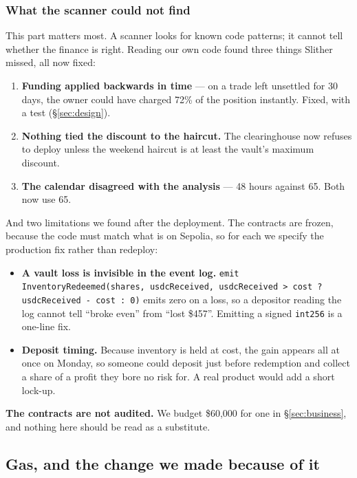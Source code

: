 \documentclass[11pt,a4paper]{article}
\begin{document}
\subsubsection*{What the scanner could not find}\label{sec:selffound}

This part matters most. A scanner looks for known code patterns; it cannot tell whether the finance
is right. Reading our own code found three things Slither missed, all now fixed:

\begin{enumerate}
  \item \textbf{Funding applied backwards in time} — on a trade left unsettled for 30 days, the owner
  could have charged 72\% of the position instantly. Fixed, with a test (\S\ref{sec:design}).
  \item \textbf{Nothing tied the discount to the haircut.} The clearinghouse now refuses to deploy
  unless the weekend haircut is at least the vault's maximum discount.
  \item \textbf{The calendar disagreed with the analysis} — 48 hours against 65. Both now use 65.
\end{enumerate}

And two limitations we found after the deployment. The contracts are frozen, because the code must
match what is on Sepolia, so for each we specify the production fix rather than redeploy:

\begin{itemize}
  \item \textbf{A vault loss is invisible in the event log.}
  \texttt{emit InventoryRedeemed(shares, usdcReceived, usdcReceived > cost ? usdcReceived - cost : 0)}
  emits zero on a loss, so a depositor reading the log cannot tell ``broke even'' from ``lost
  \$457''. Emitting a signed \texttt{int256} is a one-line fix.
  \item \textbf{Deposit timing.} Because inventory is held at cost, the gain appears all at once on
  Monday, so someone could deposit just before redemption and collect a share of a profit they bore
  no risk for. A real product would add a short lock-up.
\end{itemize}

\textbf{The contracts are not audited.} We budget \$60,000 for one in \S\ref{sec:business}, and
nothing here should be read as a substitute.

\subsection{Gas, and the change we made because of it}\label{sec:gas}
\end{document}
